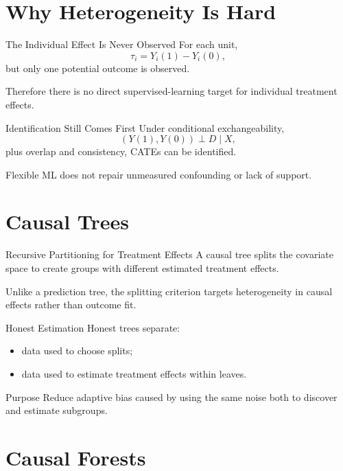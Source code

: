 \documentclass[aspectratio=169,11pt]{beamer}
\begin{document}
\section{Why Heterogeneity Is Hard}

\begin{frame}{The Individual Effect Is Never Observed}
For each unit,
\[
\tau_i=Y_i(1)-Y_i(0),
\]
but only one potential outcome is observed.

Therefore there is no direct supervised-learning target for individual treatment effects.
\end{frame}

\begin{frame}{Identification Still Comes First}
Under conditional exchangeability,
\[
(Y(1),Y(0))\perp D\mid X,
\]
plus overlap and consistency, CATEs can be identified.

Flexible ML does not repair unmeasured confounding or lack of support.
\end{frame}

\section{Causal Trees}

\begin{frame}{Recursive Partitioning for Treatment Effects}
A causal tree splits the covariate space to create groups with different estimated treatment effects.

Unlike a prediction tree, the splitting criterion targets heterogeneity in causal effects rather than outcome fit.
\end{frame}

\begin{frame}{Honest Estimation}
Honest trees separate:
\begin{itemize}
\item data used to choose splits;
\item data used to estimate treatment effects within leaves.
\end{itemize}

\begin{block}{Purpose}
Reduce adaptive bias caused by using the same noise both to discover and estimate subgroups.
\end{block}
\end{frame}

\section{Causal Forests}
\end{document}
